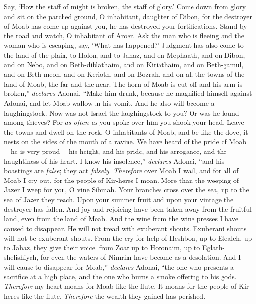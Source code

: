 \begin{biblechapter}
Say, ‘How the staff of might is broken, 
the staff of glory.’
\verse Come down from glory and sit on the parched ground, 
O inhabitant, daughter of Dibon, 
for the destroyer of Moab has come up against you, 
he has destroyed your fortifications.
\verse Stand by the road and watch, 
O inhabitant of Aroer. 
Ask the man who is fleeing and the woman who is escaping, 
say, ‘What has happened?’
\verse Judgment has also come to the land of the plain, to Holon, and to Jahaz, and on Mephaath,
\verse and on Dibon, and on Nebo, and on Beth-diblathaim,
\verse and on Kiriathaim, and on Beth-gamul, and on Beth-meon,
\verse and on Kerioth, and on Bozrah, and on all the towns of the land of Moab, the far and the near.
\verse The horn of Moab is cut off and his arm is broken,” \textit{declares} Adonai.
\verse “Make him drunk, 
because he magnified himself against Adonai, 
and let Moab wallow in his vomit. 
And he also will become a laughingstock.
\verse Now was not Israel the laughingstock to you? 
Or was he found among thieves? 
For \textit{as often as} you spoke over him 
you shook your head.
\verse Leave the towns and dwell on the rock, 
O inhabitants of Moab, 
and be like the dove, 
it nests on the sides of the mouth of a ravine.
\verse We have heard of the pride of Moab 
—he is very proud— 
his height, and his pride, and his arrogance, 
and the haughtiness of his heart.
\verse I know his insolence,” \textit{declares} Adonai, 
“and his boastings are \textit{false}; 
they act \textit{falsely}.
\verse \textit{Therefore} over Moab I wail, 
and for all of Moab I cry out, 
for the people of Kir-heres I moan.
\verse More than the weeping of Jazer 
I weep for you, O vine Sibmah. 
Your branches cross over the sea, 
up to the sea of Jazer they reach. 
Upon your summer fruit and upon your vintage 
the destroyer has fallen.
\verse And joy and rejoicing have been taken away from the fruitful land, 
even from the land of Moab. 
And the wine from the wine presses 
I have caused to disappear. 
He will not tread with exuberant shouts. 
Exuberant shouts will not be exuberant shouts.
\verse From the cry for help of Heshbon, up to Elealeh, 
up to Jahaz, they give their voice, 
from Zoar up to Horonaim, up to Eglath-shelishiyah, 
for even the waters of Nimrim have become as a desolation.
\verse And I will cause to disappear for Moab,” \textit{declares} Adonai, 
“the one who presents a sacrifice at a high place, 
and the one who burns a smoke offering to his gods.
\verse \textit{Therefore} my heart moans for Moab like the flute. 
It moans for the people of Kir-heres like the flute. 
\textit{Therefore} the wealth they gained has perished.

\end{biblechapter}
